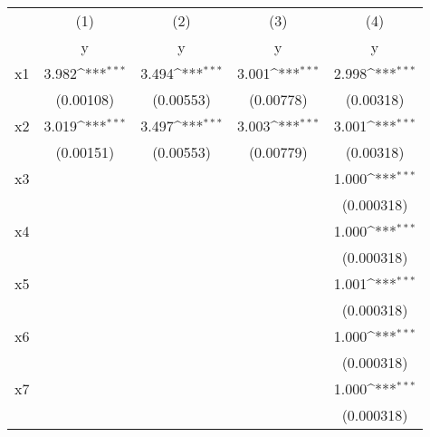 {
\def\sym#1{\ifmmode^{#1}\else\(^{#1}\)\fi}
\begin{tabular}{l*{4}{c}}
\toprule
                    &\multicolumn{1}{c}{(1)}&\multicolumn{1}{c}{(2)}&\multicolumn{1}{c}{(3)}&\multicolumn{1}{c}{(4)}\\
                    &\multicolumn{1}{c}{y}&\multicolumn{1}{c}{y}&\multicolumn{1}{c}{y}&\multicolumn{1}{c}{y}\\
\midrule
x1                  &       3.982\sym{***}&       3.494\sym{***}&       3.001\sym{***}&       2.998\sym{***}\\
                    &   (0.00108)         &   (0.00553)         &   (0.00778)         &   (0.00318)         \\
\addlinespace
x2                  &       3.019\sym{***}&       3.497\sym{***}&       3.003\sym{***}&       3.001\sym{***}\\
                    &   (0.00151)         &   (0.00553)         &   (0.00779)         &   (0.00318)         \\
\addlinespace
x3                  &                     &                     &                     &       1.000\sym{***}\\
                    &                     &                     &                     &  (0.000318)         \\
\addlinespace
x4                  &                     &                     &                     &       1.000\sym{***}\\
                    &                     &                     &                     &  (0.000318)         \\
\addlinespace
x5                  &                     &                     &                     &       1.001\sym{***}\\
                    &                     &                     &                     &  (0.000318)         \\
\addlinespace
x6                  &                     &                     &                     &       1.000\sym{***}\\
                    &                     &                     &                     &  (0.000318)         \\
\addlinespace
x7                  &                     &                     &                     &       1.000\sym{***}\\
                    &                     &                     &                     &  (0.000318)         \\

\end{tabular}}
